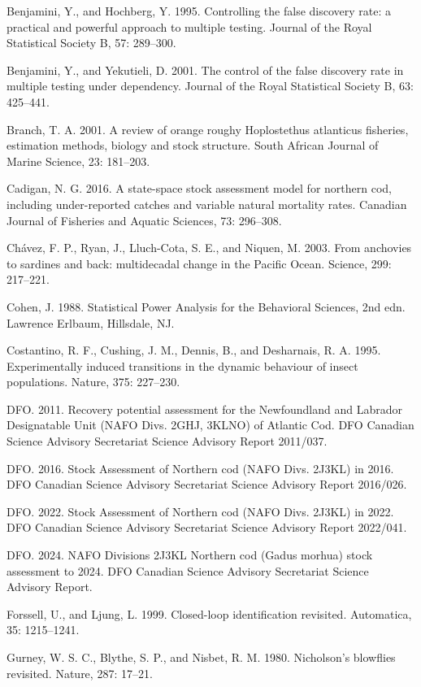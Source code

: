 \documentclass[11pt]{article}
\begin{document}
Benjamini, Y., and Hochberg, Y. 1995. Controlling the false discovery
rate: a practical and powerful approach to multiple testing. Journal of
the Royal Statistical Society B, 57: 289--300.

Benjamini, Y., and
Yekutieli, D. 2001. The control of the false discovery rate in multiple
testing under dependency. Journal of the Royal Statistical Society B,
63: 425--441.

Branch, T. A. 2001. A review of orange roughy Hoplostethus atlanticus
fisheries, estimation methods, biology and stock structure. South
African Journal of Marine Science, 23: 181--203.

Cadigan, N. G. 2016. A state-space stock assessment model for northern
cod, including under-reported catches and variable natural mortality
rates. Canadian Journal of Fisheries and Aquatic Sciences, 73: 296--308.

Ch\'avez, F. P., Ryan, J., Lluch-Cota, S. E., and Niquen, M. 2003. From
anchovies to sardines and back: multidecadal change in the Pacific
Ocean. Science, 299: 217--221.

Cohen, J. 1988. Statistical Power Analysis for the Behavioral Sciences,
2nd edn. Lawrence Erlbaum, Hillsdale, NJ.

Costantino, R. F., Cushing, J. M., Dennis, B., and Desharnais, R. A.
1995. Experimentally induced transitions in the dynamic behaviour of
insect populations. Nature, 375: 227--230.

DFO. 2011. Recovery potential assessment for the Newfoundland and
Labrador Designatable Unit (NAFO Divs. 2GHJ, 3KLNO) of Atlantic Cod. DFO
Canadian Science Advisory Secretariat Science Advisory Report 2011/037.

DFO. 2016. Stock Assessment of Northern cod (NAFO Divs. 2J3KL) in 2016.
DFO Canadian Science Advisory Secretariat Science Advisory Report
2016/026.

DFO. 2022. Stock Assessment of Northern cod (NAFO Divs. 2J3KL) in 2022.
DFO Canadian Science Advisory Secretariat Science Advisory Report
2022/041.

DFO. 2024. NAFO Divisions 2J3KL Northern cod (Gadus morhua) stock
assessment to 2024. DFO Canadian Science Advisory Secretariat Science
Advisory Report.

Forssell, U., and Ljung, L. 1999. Closed-loop identification revisited.
Automatica, 35: 1215--1241.

Gurney, W. S. C., Blythe, S. P., and Nisbet, R. M. 1980. Nicholson's
blowflies revisited. Nature, 287: 17--21.
\end{document}
